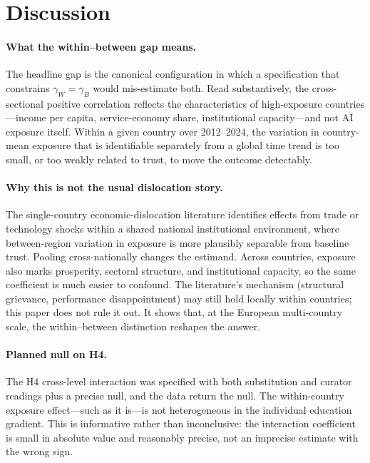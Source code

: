 \section{Discussion}\label{sec:discussion}

\paragraph{What the within--between gap means.}
The headline gap is the canonical
\citet{SchmidtCatranFairbrother2016} configuration in which a
specification that constrains $\gamma_W = \gamma_B$ would mis-estimate
both. Read substantively, the cross-sectional positive correlation
reflects the characteristics of high-exposure countries---income per
capita, service-economy share, institutional capacity---and not AI
exposure itself. Within a given country over 2012--2024, the variation
in country-mean exposure that is identifiable separately from a global
time trend is too small, or too weakly related to trust, to move the
outcome detectably.

\paragraph{Why this is not the usual dislocation story.}
The single-country economic-dislocation literature
\citep{ColantoneStanig2018,FreyBergerChen2018,AnelliColantoneStanig2021}
identifies effects from trade or technology shocks within a shared
national institutional environment, where between-region variation in
exposure is more plausibly separable from baseline trust. Pooling
cross-nationally changes the estimand. Across countries, exposure also
marks prosperity, sectoral structure, and institutional capacity, so
the same coefficient is much easier to confound. The literature's
mechanism (structural grievance, performance disappointment) may still
hold locally within countries; this paper does not rule it out. It
shows that, at the European multi-country scale, the within--between
distinction reshapes the answer.

\paragraph{Planned null on H4.}
The H4 cross-level interaction was specified with both substitution and
curator readings plus a precise null, and the data return the null. The
within-country exposure effect---such as it is---is not heterogeneous
in the individual education gradient. This is informative rather than
inconclusive: the interaction coefficient is small in absolute value
and reasonably precise, not an imprecise estimate with the wrong sign.

